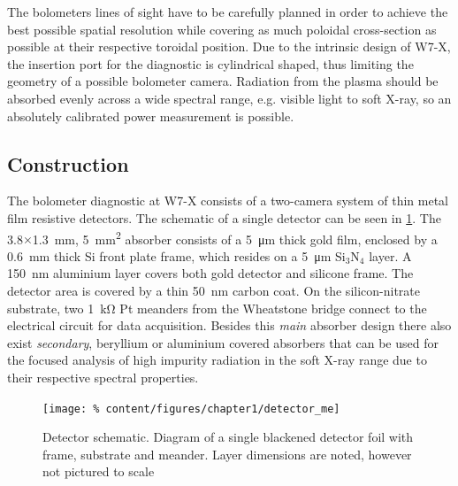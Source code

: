             The bolometers lines of sight have to be carefully planned in order to achieve the best possible spatial resolution while covering as much poloidal cross-section as possible at their respective toroidal position. Due to the intrinsic design of W7-X, the insertion port for the diagnostic is cylindrical shaped, thus limiting the geometry of a possible bolometer camera. Radiation from the plasma should be absorbed evenly across a wide spectral range, e.g. visible light to soft X-ray, so an absolutely calibrated power measurement is possible.%
%
        \subsection{Construction}\label{subsec:construction}%

            The bolometer diagnostic at W7-X consists of a two-camera system of thin metal film resistive detectors. The schematic of a single detector can be seen in \cref{fig:detector_me}. The 3.8$\times$\SI{1.3}{\milli\meter}, \SI{5}{\milli\meter\squared} absorber consists of a \mbox{\SI{5}{\micro\meter}} thick gold film, enclosed by a \mbox{\SI{0.6}{\milli\meter}} thick Si front plate frame, which resides on a \mbox{\SI{5}{\micro\meter}} Si$_{3}$N$_{4}$ layer. A \mbox{\SI{150}{\nano\meter}} aluminium layer covers both gold detector and silicone frame. The detector area is covered by a thin \mbox{\SI{50}{\nano\meter}} carbon coat. On the silicon-nitrate substrate, two \mbox{\SI{1}{\kilo\ohm}} Pt meanders from the Wheatstone bridge connect to the electrical circuit for data acquisition. Besides this \textit{main} absorber design there also exist \textit{secondary}, beryllium or aluminium covered absorbers that can be used for the focused analysis of high impurity radiation in the soft X-ray range due to their respective spectral properties.\\%
%
            \begin{figure}[t]%
                \centering%
                \texttt{[image: \%
                    content/figures/chapter1/detector\_me]}%
                \caption{%
                    Detector schematic. Diagram of a single blackened detector foil with frame, substrate and meander. Layer dimensions are noted, however not pictured to scale}\label{fig:detector_me}%
            \end{figure}%
%
